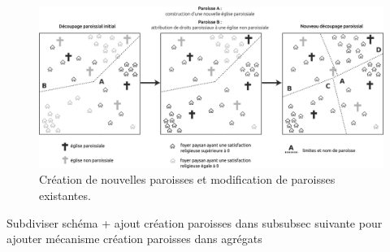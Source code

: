 \begin{figure}[!h]
	\centering
	\includegraphics[width=1\linewidth]{src/Chapitre_TMD/Fig5}
	\caption{Création de nouvelles paroisses et modification de paroisses existantes.}
\label{fig:fig5}
\end{figure}

{\blueroman Subdiviser schéma + ajout création paroisses dans subsubsec suivante pour ajouter mécanisme création paroisses dans agrégats}

\clearpage
